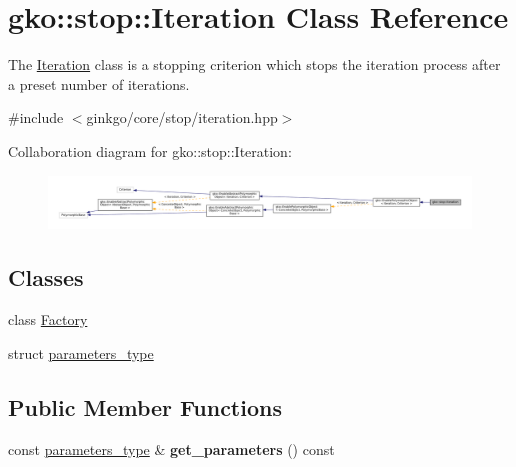 \hypertarget{classgko_1_1stop_1_1Iteration}{}\section{gko\+:\+:stop\+:\+:Iteration Class Reference}
\label{classgko_1_1stop_1_1Iteration}


The \hyperlink{classgko_1_1stop_1_1Iteration}{Iteration} class is a stopping criterion which stops the iteration process after a preset number of iterations.  




{\ttfamily \#include $<$ginkgo/core/stop/iteration.\+hpp$>$}



Collaboration diagram for gko\+:\+:stop\+:\+:Iteration\+:
\nopagebreak
\begin{figure}[H]
\begin{center}
\leavevmode
\includegraphics[width=350pt]{classgko_1_1stop_1_1Iteration__coll__graph}
\end{center}
\end{figure}
\subsection*{Classes}
\begin{DoxyCompactItemize}
\item 
class \hyperlink{classgko_1_1stop_1_1Iteration_1_1Factory}{Factory}
\item 
struct \hyperlink{structgko_1_1stop_1_1Iteration_1_1parameters__type}{parameters\+\_\+type}
\end{DoxyCompactItemize}
\subsection*{Public Member Functions}
\begin{DoxyCompactItemize}
\item 
\mbox{\label{classgko_1_1stop_1_1Iteration_ae8ca977977e5fc228583cd25068b3ee2}} 
const \hyperlink{structgko_1_1stop_1_1Iteration_1_1parameters__type}{parameters\+\_\+type} \& {\bfseries get\+\_\+parameters} () const
\end{DoxyCompactItemize}
